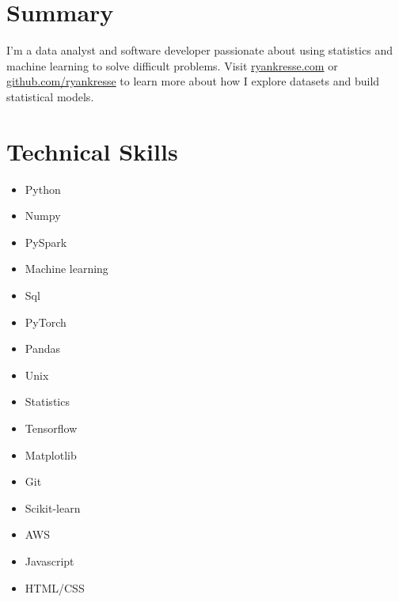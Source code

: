 \documentclass[11pt]{article}
\begin{document}
	
	
	\smallskip
	

	\section{Summary}
			I’m a data analyst and software developer passionate about using statistics and
			machine learning to solve difficult problems. Visit \href{http://ryankresse.com/blog}{ryankresse.com} or \href{https://github.com/ryankresse}{github.com/ryankresse} to learn more about how I explore datasets and build statistical models.	
	\section{Technical Skills}
		\begin{multicols}{4}
			\begin{itemize}
				\item Python 				
				\item Numpy				 
				\item PySpark
				\item Machine learning
				
				\columnbreak
				\item Sql 
				\item PyTorch
				\item Pandas 
				\item Unix 
				
				\columnbreak
				\item Statistics
				\item Tensorflow 
				\item Matplotlib			
				\item Git
				
							
				
				\columnbreak 
				\item Scikit-learn							
				
				\item AWS
				\item Javascript 
				\item HTML/CSS 
				
				 				
				\columnbreak 
				
			\end{itemize}
		\end{multicols}
	
\end{document}
